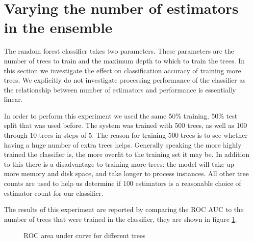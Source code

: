 \documentclass[ %
                    author={Sam Phippen},
                supervisor={Dr. Rafal Bogacz},
                     title={Real time voice activity detectors in noisy personal computing environments},
                  subtitle={},
                    degree={MEng},
                      year={2012} ]{thesis}
\begin{document}
\section{Varying the number of estimators in the ensemble}

The random forest classifier takes two parameters. These parameters are the
number of trees to train and the maximum depth to which to train the trees. In this
section we investigate the effect on classification accuracy of training more
trees. We explicitly do not investigate processing performance of the
classifier as the relationship between number of estimators and performance is
essentially linear.

In order to perform this experiment we used the same 50\% training, 50\% test
split that was used before. The system was trained with 500 trees, as well as
100 through 10 trees in steps of 5. The reason for training 500 trees is to see
whether having a huge number of extra trees helps. Generally speaking the more
highly trained the classifier is, the more overfit to the training set it may
be. In addition to this there is a disadvantage to training more trees: the
model will take up more memory and disk space, and take longer to process
instances. All other tree counts are used to help us determine if 100
estimators is a reasonable choice of estimator count for our classifier.

The results of this experiment are reported by comparing the ROC AUC to the
number of trees that were trained in the classifier, they are shown in
figure \ref{fig:roc-trees}.

\begin{figure}
    \caption{ROC area under curve for different trees}
    \label{fig:roc-trees}
\end{figure}
\end{document}
